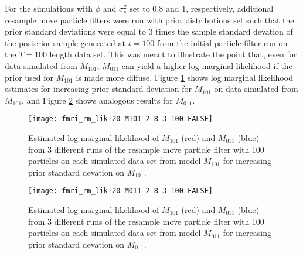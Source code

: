 \documentclass{article}
\begin{document}
\clearpage

For the simulations with $\phi$ and $\sigma^2_s$ set to 0.8 and 1, respectively, additional resample move particle filters were run with prior distributions set such that the prior standard deviations were equal to 3 times the sample standard devation of the posterior sample generated at $t = 100$ from the initial particle filter run on the $T = 100$ length data set. This was meant to illustrate the point that, even for data simulated from $M_{101}$, $M_{011}$ can yield a higher log marginal likelihood if the prior used for $M_{101}$ is made more diffuse. Figure \ref{fig:fmri-lik-sd-M101} shows log marginal likelihood estimates for increasing prior standard deviation for $M_{101}$ on data simulated from $M_{101}$, and Figure \ref{fig:fmri-lik-sd-M011} shows analogous results for $M_{011}$.

\begin{figure}[ht]
\texttt{[image: fmri\_rm\_lik-20-M101-2-8-3-100-FALSE]}
\caption{Estimated log marginal likelihood of $M_{101}$ (red) and $M_{011}$ (blue) from 3 different runs of the resample move particle filter with 100 particles on each simulated data set from model $M_{101}$ for increasing prior standard devation on $M_{101}$.} \label{fig:fmri-lik-sd-M101}
\end{figure}

\begin{figure}[ht]
\texttt{[image: fmri\_rm\_lik-20-M011-2-8-3-100-FALSE]}
\caption{Estimated log marginal likelihood of $M_{101}$ (red) and $M_{011}$ (blue) from 3 different runs of the resample move particle filter with 100 particles on each simulated data set from model $M_{011}$ for increasing prior standard devation on $M_{011}$.} \label{fig:fmri-lik-sd-M011}
\end{figure}

\clearpage



\end{document}
